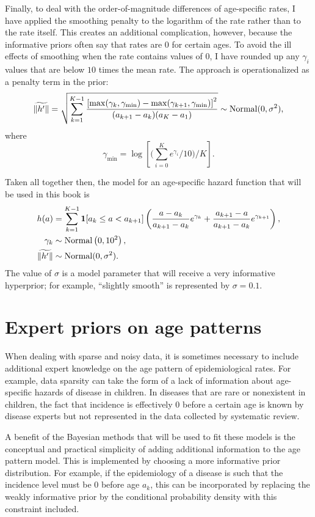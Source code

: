 Finally, to deal with the order-of-magnitude differences of
age-specific rates, I have applied the smoothing penalty to the
logarithm of the rate rather than to the rate itself.  This creates an additional
complication, however, because the informative priors often say that
rates are $0$ for certain ages.  To avoid the ill effects of
smoothing when the rate contains values of $0$, I have
rounded up any $\gamma_i$ values that are below $10$ times the mean
rate.  The approach is operationalized as a penalty term in the prior:
\[
\widetilde{\|h'\|} = \sqrt{\sum_{k=1}^{K-1}
\frac{\left[\max(\gamma_k, \gamma_{\min})
-
\max(\gamma_{k+1}, \gamma_{\min})\right]^2
}{(a_{k+1}-a_k)(a_K-a_1)}} \sim \operatorname{Normal}(0, \sigma^2),
\]
where
\[
\gamma_{\min} = \log\left[\bigg(\sum_{i=0}^K e^{\gamma_i}/10\bigg)
/ K\right].
\]

Taken all together then, the model for an age-specific hazard function
that will be used in this book is
\begin{align*}
h(a) &= \sum_{k=1}^{K-1} \mathbf{1}[a_k \leq a < a_{k+1}]
\left( \frac{a-a_k}    {a_{k+1}-a_k} e^{\gamma_k}
     + \frac{a_{k+1}-a}{a_{k+1}-a_k} e^{\gamma_{k+1}}\right),\\
\gamma_k &\sim \operatorname{Normal}\left(0, 10^2\right),\\
\widetilde{\|h'\|} &\sim \operatorname{Normal}(0, \sigma^2).\\
\end{align*}
The value of $\sigma$ is a model parameter that will receive a very
informative hyperprior; for example, ``slightly smooth'' is
represented by $\sigma=0.1$.




\chapter{Expert priors on age patterns}
\label{theory-expert_priors}

When dealing with sparse and noisy data, it is sometimes necessary to
include additional expert knowledge on the age pattern of
epidemiological rates.  For example, data sparsity can take the form
of a lack of information about age-specific hazards of disease in children.  In
diseases that are rare or nonexistent in children, the fact that incidence is
effectively $0$ before a certain age is known by disease experts but
not represented in the data collected by systematic review.

A benefit of the Bayesian methods that will be used to fit these
models is the conceptual and practical simplicity of adding additional
information to the age pattern model.  This is implemented by choosing
a more informative prior distribution.  For example, if the
epidemiology of a disease is such that the incidence level must be
$0$ before age $a_k$, this can be incorporated by replacing the
weakly informative prior by the conditional probability density with
this constraint included.

